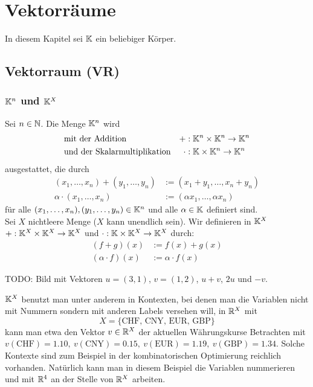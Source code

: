 \section{Vektorräume}
In diesem Kapitel sei $ \mathbb K $ ein beliebiger Körper.

\subsection{Vektorraum (VR)}
\subsubsection{$ \mathbb K^n $ und $ \mathbb K^X $}
Sei $ n \in \mathbb N $. Die Menge $ \mathbb K^n $ wird
\begin{align*}
	& \text{mit der Addition} & + &: \mathbb K^n \times \mathbb K^n \to \mathbb K^n\\
	& \text{und der Skalarmultiplikation} & \cdot &: \mathbb K \times \mathbb K^n \to \mathbb K^n
\end{align*}
ausgestattet, die durch 
\begin{align*}
	(x_1, \ldots, x_n) + (y_1, \ldots, y_n) &:= (x_1+y_1, \ldots, x_n+y_n)\\
	\alpha \cdot (x_1, \ldots, x_n) &:= (\alpha x_1, \ldots,\alpha x_n)
\end{align*}
für alle $ (x_1, \ldots, x_n), (y_1, \ldots, y_n) \in \mathbb K^n $ und alle $ \alpha \in \mathbb K $ definiert sind.\\[10pt]
Sei $ X $ nichtleere Menge ($ X $ kann unendlich sein). %
Wir definieren in $ \mathbb K^X $ $ + : \mathbb K^X \times \mathbb K^X \to \mathbb K^X $ und $ \cdot : \mathbb K \times \mathbb K^X \to \mathbb K^X $ durch:
\begin{align*}
	(f+g)(x) &:= f(x) + g(x) \\
	(\alpha \cdot f) (x) &:= \alpha \cdot f(x)
\end{align*}

TODO: Bild mit Vektoren $u=(3,1)$, $v=(1,2)$, $u+v$, $2 u$ und $-v$. 

\begin{center}
\end{center} 

\begin{bsp} 
$\mathbb K^X$ benutzt man unter anderem in Kontexten, bei denen man die Variablen nicht mit Nummern sondern mit anderen Labels versehen will, in $\mathbb R^X$ mit 
\[
	X = \{ \text{CHF}, \, \text{CNY}, \, \text{EUR}, \, \text{GBP} \}
\] kann man etwa den Vektor $v \in \mathbb R^X$ der aktuellen Währungskurse Betrachten mit $v(\text{CHF})=1{.}10, \ v(\text{CNY})=0{.}15, \ v(\text{EUR}) = 1{.}19, \ v(\text{GBP}) = 1{.}34$. Solche Kontexte sind zum Beispiel in der kombinatorischen Optimierung reichlich vorhanden. Natürlich kann man in diesem Beispiel die Variablen nummerieren und mit $\mathbb R^4$ an der Stelle von $\mathbb R^X$ arbeiten. 
\end{bsp} 

